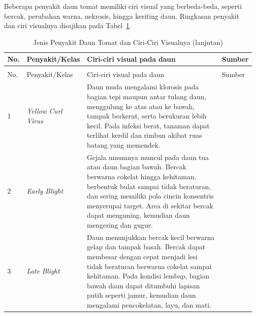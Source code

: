 \begin{sectioncontent}
\begin{subsectioncontent}
        Beberapa penyakit daun tomat memiliki ciri visual yang berbeda-beda, seperti bercak, perubahan warna, nekrosis, hingga keriting daun. Ringkasan penyakit dan ciri visualnya disajikan pada Tabel~\ref{tab:penyakit-daun-tomat}.
        
        {\small
        \setlength{\tabcolsep}{4pt}
        \renewcommand{\arraystretch}{1.25}

        \begin{longtable}{|p{0.7cm}|p{3.6cm}|p{7cm}|p{2.8cm}|}
            \caption{Jenis Penyakit Daun Tomat dan Ciri-Ciri Visualnya}
            \label{tab:penyakit-daun-tomat} \\
            \hline
            No. & Penyakit/Kelas & Ciri-ciri visual pada daun & Sumber \\
            \hline
            \endfirsthead

            \caption[]{Jenis Penyakit Daun Tomat dan Ciri-Ciri Visualnya (lanjutan)} \\
            \hline
            No. & Penyakit/Kelas & Ciri-ciri visual pada daun & Sumber \\
            \hline
            \endhead

            \hline
            \endfoot

            1 & \textit{Yellow Curl Virus}
            & Daun muda mengalami klorosis pada bagian tepi maupun antar tulang daun, menggulung ke atas atau ke bawah, tampak berkerut, serta berukuran lebih kecil. Pada infeksi berat, tanaman dapat terlihat kerdil dan rimbun akibat ruas batang yang memendek.
            & \citep{murray2023tylcv} \\
            \hline

            2 & \textit{Early Blight}
            & Gejala umumnya muncul pada daun tua atau daun bagian bawah. Bercak berwarna cokelat hingga kehitaman, berbentuk bulat sampai tidak beraturan, dan sering memiliki pola cincin konsentris menyerupai target. Area di sekitar bercak dapat menguning, kemudian daun mengering dan gugur.
            & \citep{clemson2025tomatoDiseases} \\
            \hline

            3 & \textit{Late Blight}
            & Daun menunjukkan bercak kecil berwarna gelap dan tampak basah. Bercak dapat membesar dengan cepat menjadi lesi tidak beraturan berwarna cokelat sampai kehitaman. Pada kondisi lembap, bagian bawah daun dapat ditumbuhi lapisan putih seperti jamur, kemudian daun mengalami pencokelatan, layu, dan mati.
            & \citep{clemson2025tomatoDiseases} \\
            \hline


\end{longtable}}
\end{subsectioncontent}
\end{sectioncontent}
